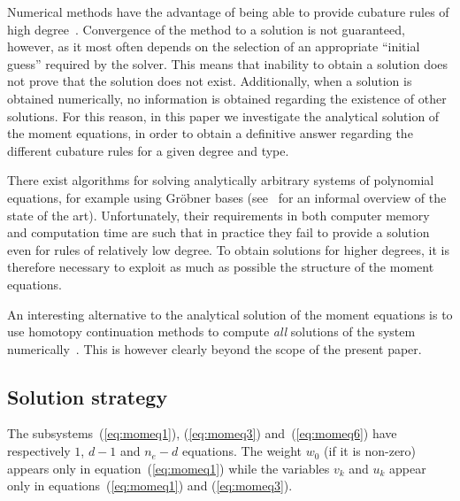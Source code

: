 \documentclass{article}
\begin{document}
Numerical methods have the advantage of being able to provide cubature rules of high degree~\citep[see e.g.][]{XiaoGimbutas2010}. Convergence of the method to a solution is not guaranteed, however, as it most often depends on the selection of an appropriate ``initial guess'' required by the solver. This means that inability to obtain a solution does not prove that the solution does not exist. Additionally, when a solution is obtained numerically, no information is obtained regarding the existence of other solutions.
For this reason, in this paper we investigate the analytical solution of the moment equations, in order to obtain a definitive answer regarding the different cubature rules for a given degree and type.



There exist algorithms for solving analytically arbitrary systems of polynomial equations, for example using Gr\"obner bases (see~\citep{Lazard2009} for an informal overview of the state of the art). Unfortunately, their requirements in both computer memory and computation time are such that in practice they fail to provide a solution even for rules of relatively low degree. To obtain solutions for higher degrees, it is therefore necessary to exploit as much as possible the structure of the moment equations.

An interesting alternative to the analytical solution of the moment equations is to use homotopy continuation methods to compute \emph{all} solutions of the system numerically~\citep{Verschelde1999}. This is however clearly beyond the scope of the present paper.



\subsection{Solution strategy}

The subsystems~(\ref{eq:momeq1}), (\ref{eq:momeq3}) and~(\ref{eq:momeq6}) have respectively $1$, $d-1$ and $n_e-d$ equations. The weight $w_0$ (if it is non-zero) appears only in equation~(\ref{eq:momeq1}) while the variables $v_k$ and $u_k$ appear only in equations~(\ref{eq:momeq1}) and (\ref{eq:momeq3}).
\end{document}
